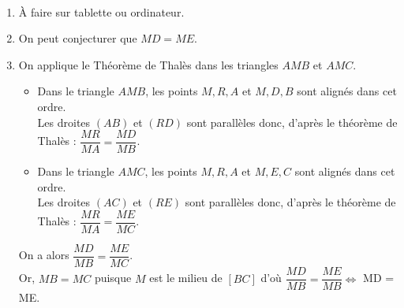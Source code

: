 \ \\ [-5mm]
    \begin{enumerate}
      \item À faire sur tablette ou ordinateur.
      \item On peut conjecturer que {\blue $MD =ME$}.
      \item On applique le Théorème de Thalès dans les triangles $AMB$ et $AMC$.
      \begin{itemize}
         \item Dans le triangle $AMB$, les points $M, R, A$ et $M, D, B$ sont alignés dans cet ordre. \\ [1mm]
            Les droites $(AB)$ et $(RD)$ sont parallèles donc, d'après le théorème de Thalès : $\dfrac{MR}{MA} =\dfrac{MD}{MB}$. \smallskip
         \item Dans le triangle $AMC$, les points $M, R, A$ et $M, E, C$ sont alignés dans cet ordre. \\ [1mm]
            Les droites $(AC)$ et $(RE)$ sont parallèles donc, d'après le théorème de Thalès : $\dfrac{MR}{MA} =\dfrac{ME}{MC}$. \smallskip
      \end{itemize}
      On a alors $\dfrac{MD}{MB} =\dfrac{ME}{MC}$. \\
      Or, $MB =MC$ puisque $M$ est le milieu de $[BC]$ d'où $\dfrac{MD}{MB} =\dfrac{ME}{MB} \iff$ {\blue MD = ME}.
   \end{enumerate}
